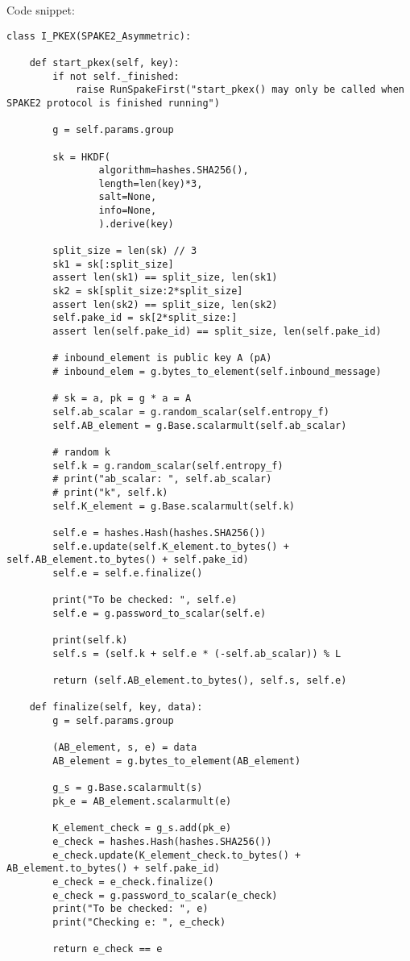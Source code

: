 Code snippet:
\begin{verbatim}
class I_PKEX(SPAKE2_Asymmetric):

    def start_pkex(self, key):
        if not self._finished: 
            raise RunSpakeFirst("start_pkex() may only be called when SPAKE2 protocol is finished running")

        g = self.params.group

        sk = HKDF(
                algorithm=hashes.SHA256(),
                length=len(key)*3,
                salt=None,
                info=None,
                ).derive(key)

        split_size = len(sk) // 3
        sk1 = sk[:split_size]
        assert len(sk1) == split_size, len(sk1)
        sk2 = sk[split_size:2*split_size]
        assert len(sk2) == split_size, len(sk2)
        self.pake_id = sk[2*split_size:]
        assert len(self.pake_id) == split_size, len(self.pake_id)

        # inbound_element is public key A (pA)
        # inbound_elem = g.bytes_to_element(self.inbound_message) 

        # sk = a, pk = g * a = A
        self.ab_scalar = g.random_scalar(self.entropy_f)
        self.AB_element = g.Base.scalarmult(self.ab_scalar)

        # random k
        self.k = g.random_scalar(self.entropy_f)
        # print("ab_scalar: ", self.ab_scalar)
        # print("k", self.k)
        self.K_element = g.Base.scalarmult(self.k)

        self.e = hashes.Hash(hashes.SHA256())
        self.e.update(self.K_element.to_bytes() + self.AB_element.to_bytes() + self.pake_id)
        self.e = self.e.finalize()

        print("To be checked: ", self.e)
        self.e = g.password_to_scalar(self.e)
        
        print(self.k)
        self.s = (self.k + self.e * (-self.ab_scalar)) % L

        return (self.AB_element.to_bytes(), self.s, self.e)

    def finalize(self, key, data):
        g = self.params.group

        (AB_element, s, e) = data
        AB_element = g.bytes_to_element(AB_element) 

        g_s = g.Base.scalarmult(s)
        pk_e = AB_element.scalarmult(e)

        K_element_check = g_s.add(pk_e)
        e_check = hashes.Hash(hashes.SHA256())
        e_check.update(K_element_check.to_bytes() + AB_element.to_bytes() + self.pake_id)
        e_check = e_check.finalize()
        e_check = g.password_to_scalar(e_check)
        print("To be checked: ", e)
        print("Checking e: ", e_check)

        return e_check == e
\end{verbatim}

